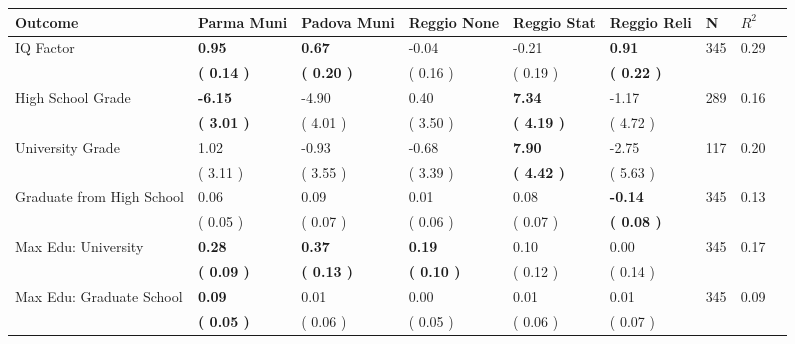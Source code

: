 \begin{tabular}{L{6.2cm} C{1.8cm} C{1.8cm} C{1.8cm} C{1.8cm} C{1.8cm} C{1.8cm} C{0.3cm} C{0.3cm}}
\toprule
 \textbf{Outcome} & \textbf{Parma Muni} & \textbf{Padova Muni} & \textbf{Reggio None} & \textbf{Reggio Stat} & \textbf{Reggio Reli} & \textbf{N} & \textbf{$ R^2$} \\
\midrule
IQ Factor & \textbf{     0.95} & \textbf{     0.67} &     -0.04 &     -0.21 & \textbf{     0.91}  & 345 &       0.29 \\ 
 & \textbf{(     0.14 )} & \textbf{(     0.20 )} & (     0.16 ) & (     0.19 ) & \textbf{(     0.22 )}  & \\
High School Grade & \textbf{    -6.15} &     -4.90 &      0.40 & \textbf{     7.34} &     -1.17  & 289 &       0.16 \\ 
 & \textbf{(     3.01 )} & (     4.01 ) & (     3.50 ) & \textbf{(     4.19 )} & (     4.72 )  & \\
University Grade &      1.02 &     -0.93 &     -0.68 & \textbf{     7.90} &     -2.75  & 117 &       0.20 \\ 
 & (     3.11 ) & (     3.55 ) & (     3.39 ) & \textbf{(     4.42 )} & (     5.63 )  & \\
Graduate from High School &      0.06 &      0.09 &      0.01 &      0.08 & \textbf{    -0.14}  & 345 &       0.13 \\ 
 & (     0.05 ) & (     0.07 ) & (     0.06 ) & (     0.07 ) & \textbf{(     0.08 )}  & \\
Max Edu: University & \textbf{     0.28} & \textbf{     0.37} & \textbf{     0.19} &      0.10 &      0.00  & 345 &       0.17 \\ 
 & \textbf{(     0.09 )} & \textbf{(     0.13 )} & \textbf{(     0.10 )} & (     0.12 ) & (     0.14 )  & \\
Max Edu: Graduate School & \textbf{     0.09} &      0.01 &      0.00 &      0.01 &      0.01  & 345 &       0.09 \\ 
 & \textbf{(     0.05 )} & (     0.06 ) & (     0.05 ) & (     0.06 ) & (     0.07 )  & \\
\bottomrule
\end{tabular}

